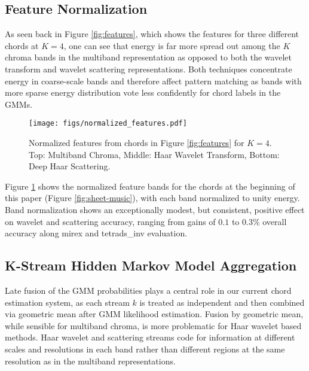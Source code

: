 \subsection{Feature Normalization}

As seen back in Figure \ref{fig:features}, which shows the features for three different chords at $K=4$, one can see that energy is far more spread out among the $K$ chroma bands in the multiband representation as opposed to both the wavelet transform and wavelet scattering representations. Both techniques concentrate energy in coarse-scale bands and therefore affect pattern matching as bands with more sparse energy distribution vote less confidently for chord labels in the GMMs.

\begin{figure}
\begin{center}
\texttt{[image: figs/normalized\_features.pdf]}
\end{center}
\caption{Normalized features from chords in Figure \ref{fig:features} for $K=4$. Top: Multiband Chroma, Middle: Haar Wavelet Transform, Bottom: Deep Haar Scattering.}
\label{fig:normalized}
\end{figure}

Figure \ref{fig:normalized} shows the normalized feature bands for the chords at the beginning of this paper (Figure \ref{fig:sheet-music}), with each band normalized to unity energy. Band normalization shows an exceptionally modest, but consistent, positive effect on wavelet and scattering accuracy, ranging from gains of $0.1$ to $0.3 \%$ overall accuracy along mirex and tetrads\_inv evaluation.

\subsection{K-Stream Hidden Markov Model Aggregation}

Late fusion of the GMM probabilities plays a central role in our current chord estimation system, as each stream $k$ is treated as independent and then combined via geometric mean after GMM likelihood estimation. Fusion by geometric mean, while sensible for multiband chroma, is more problematic for Haar wavelet based methods. Haar wavelet and scattering streams code for information at different scales and resolutions in each band rather than different regions at the same resolution as in the multiband representations. 

